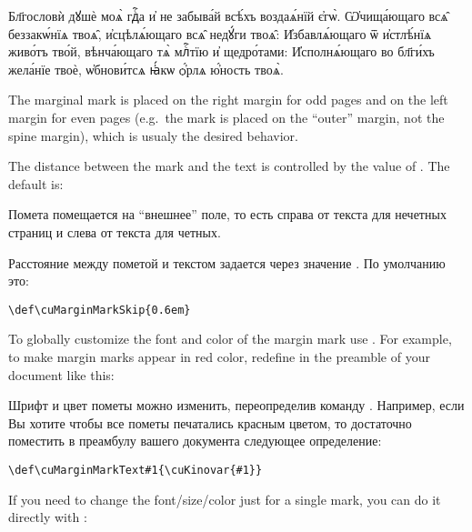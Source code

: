 \begin{center}
\begin{churchslavonic}
\let\hMn=\cuMarginMark
\let\hKv=\cuKinovar
\parbox{0.75\textwidth}{%
  \textwidth
  \hMn{в҃}\hKv Бл҃гословѝ дꙋшѐ моѧ̀ гдⷭ҇а и҆ не забыва́й всѣ́хъ  воздаѧ́нїй є҆гѡ̀. 
  \hMn{а҃}\hKv Ѡ҆чища́ющаго всѧ̑ беззакѡ́нїѧ твоѧ̑, и҆сцѣлѧ́ющаго  всѧ̑ недꙋ́ги твоѧ̑:
  \hMn{в҃}\hKv И҆збавлѧ́ющаго ѿ и҆стлѣ́нїѧ  живо́тъ тво́й, вѣнча́ющаго тѧ̀ млⷭ҇тїю и҆ щедро́тами: 
  \hMn{а҃}\hKv И҆сполнѧ́ющаго во бл҃ги́хъ жела́нїе твоѐ, ѡ҆бнови́тсѧ  ꙗ҆́кѡ ѻ҆́рлѧ ю҆́ность твоѧ̀.
}
\end{churchslavonic}
\end{center}

\begin{EN}
The marginal mark is placed on the right margin for odd pages
and on the left margin for even pages (e.g.~the mark is placed on the
``outer'' margin, not the spine margin), which is usualy the desired behavior.

The distance between the mark and the text is controlled by the value
of . The default is:
\end{EN}
%
\begin{RU}
Помета помещается на ``внешнее'' поле, то есть справа от текста для нечетных страниц и слева от текста для четных.

Расстояние между пометой и текстом задается через значение . По умолчанию это:
\end{RU}
%
\begin{verbatim}
\def\cuMarginMarkSkip{0.6em}
\end{verbatim}

\begin{EN}
To globally customize the font and color of the margin mark use .
For example, to make margin marks appear in red color, redefine  in the preamble of your
document like this:
\end{EN}
%
\begin{RU}
Шрифт и цвет пометы можно изменить, переопределив команду .
Например, если Вы хотите чтобы все пометы печатались красным цветом, то достаточно поместить
в преамбулу вашего документа следующее определение: 
\end{RU}
\begin{verbatim}
\def\cuMarginMarkText#1{\cuKinovar{#1}}
\end{verbatim}

\begin{EN}
If you need to change the font/size/color just for a single mark, you can do it directly with :
\end{EN}

